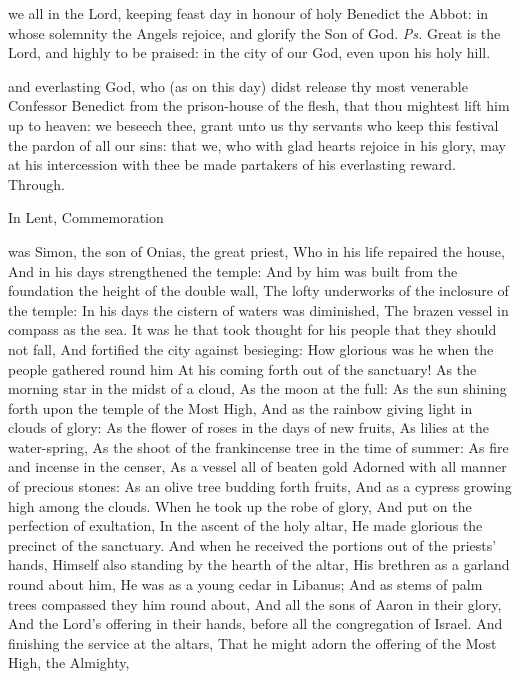 

\introit
 we all in the Lord, keeping feast day in honour of holy Benedict the Abbot: in whose solemnity the Angels rejoice, and glorify the Son of God. \textit{Ps.} Great is the Lord, and highly to be praised: in the city of our God, even upon his holy hill.

\collect
{} and everlasting God, who (as on this day) didst release thy most venerable Confessor Benedict from the prison-house of the flesh, that thou mightest lift him up to heaven: we beseech thee, grant unto us thy servants who keep this festival the pardon of all our sins: that we, who with glad hearts rejoice in his glory, may at his intercession with thee be made partakers of his everlasting reward. Through.
\begin{rubric}
    In Lent, Commemoration 
\end{rubric}

 was Simon, the son of Onias, the great priest, Who in his life repaired the house, And in his days strengthened the temple: And by him was built from the foundation the height of the double wall, The lofty underworks of the inclosure of the temple: In his days the cistern of waters was diminished, The brazen vessel in compass as the sea. It was he that took thought for his people that they should not fall, And fortified the city against besieging: How glorious was he when the people gathered round him At his coming forth out of the sanctuary! As the morning star in the midst of a cloud, As the moon at the full: As the sun shining forth upon the temple of the Most High, And as the rainbow giving light in clouds of glory: As the flower of roses in the days of new fruits, As lilies at the water-spring, As the shoot of the frankincense tree in the time of summer: As fire and incense in the censer, As a vessel all of beaten gold Adorned with all manner of precious stones: As an olive tree budding forth fruits, And as a cypress growing high among the clouds. When he took up the robe of glory, And put on the perfection of exultation, In the ascent of the holy altar, He made glorious the precinct of the sanctuary. And when he received the portions out of the priests' hands, Himself also standing by the hearth of the altar, His brethren as a garland round about him, He was as a young cedar in Libanus; And as stems of palm trees compassed they him round about, And all the sons of Aaron in their glory, And the Lord's offering in their hands, before all the congregation of Israel. And finishing the service at the altars, That he might adorn the offering of the Most High, the Almighty,

